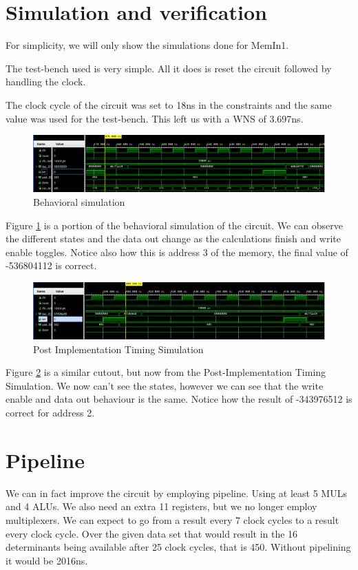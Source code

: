 \documentclass[12pt]{article}
\begin{document}
\section{Simulation and verification}

For simplicity, we will only show the simulations done for MemIn1.

The test-bench used is very simple. All it does is reset the circuit followed by handling the clock.

The clock cycle of the circuit was set to 18ns in the constraints and the same value was used for the test-bench. This left us with a WNS of 3.697ns.

\begin{figure}[H]
	\centering
	\includegraphics[width=0.7\linewidth]{Imagens/Behavioral.png}
	\caption{Behavioral simulation}
	\label{fig:behav}
\end{figure}

Figure \ref{fig:behav} is a portion of the behavioral simulation of the circuit. We can observe the different states and the data out change as the calculations finish and write enable toggles. Notice also how this is address 3 of the memory, the final value of -536804112 is correct.


\begin{figure}[H]
	\centering
	\includegraphics[width=0.7\linewidth]{Imagens/PostImplementation.png}
	\caption{Post Implementation Timing Simulation}
	\label{fig:PImple}
\end{figure}

Figure \ref{fig:PImple} is a similar cutout, but now from the Post-Implementation Timing Simulation. We now can't see the states, however we can see that the write enable and data out behaviour is the same. Notice how the result of -343976512 is correct for address 2.

\section{Pipeline}

We can in fact improve the circuit by employing pipeline. Using at least 5 MULs and 4 ALUs. We also need an extra 11 registers, but we no longer employ multiplexers.
We can expect to go from a result every 7 clock cycles to a result every clock cycle. Over the given data set that would result in the 16 determinants being available after 25 clock cycles, that is 450. Without pipelining it would be 2016ns.
\end{document}
